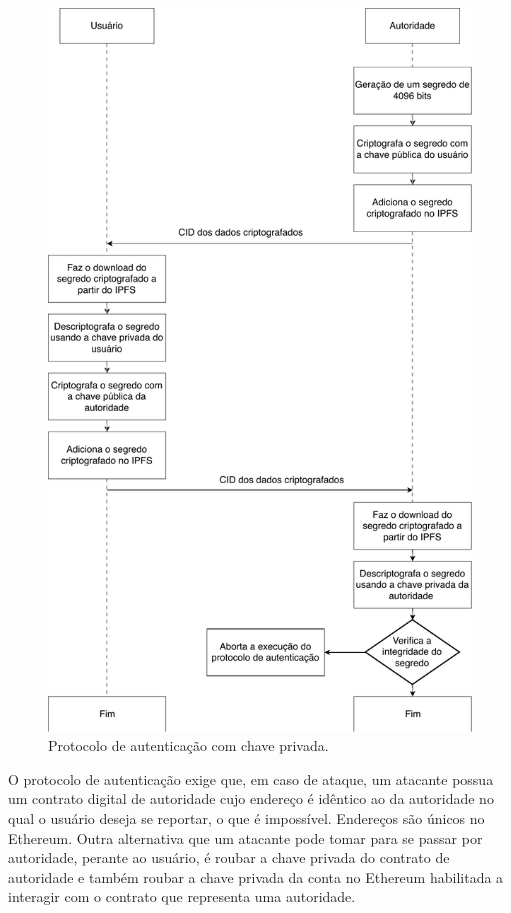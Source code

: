 \documentclass[tcc,capa]{texufpel}
\begin{document}
        \begin{figure}[]
            \centering
            \includegraphics[scale=0.75]{imagens/protocolo-handshake-com-chave-privada.pdf}
            \caption{Protocolo de autenticação com chave privada.}
            \label{fig:handshake-com-chave}
        \end{figure}
        
        O protocolo de autenticação exige que, em caso de ataque, um atacante possua um contrato digital de autoridade cujo endereço é idêntico ao da autoridade no qual o usuário deseja se reportar, o que é impossível. Endereços são únicos no Ethereum. Outra alternativa que um atacante pode tomar para se passar por autoridade, perante ao usuário, é roubar a chave privada do contrato de autoridade e também roubar a chave privada da conta no Ethereum habilitada a interagir com o contrato que representa uma autoridade.
        
\end{document}
